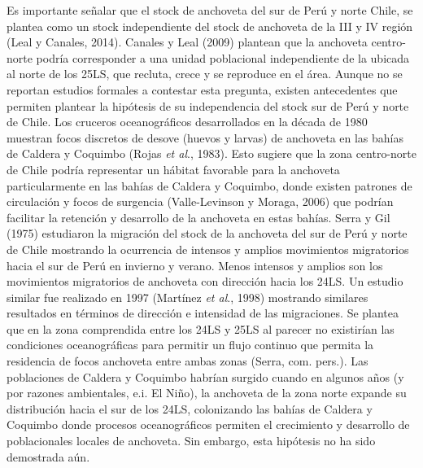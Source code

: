 \documentclass[letter,11pt]{article}
\begin{document}
Es importante se\~{n}alar que el stock de anchoveta del sur de Per\'u y norte
Chile, se plantea como un stock independiente del stock de anchoveta de
la III y IV regi\'on (Leal y Canales, 2014). Canales y Leal (2009)
plantean que la anchoveta centro-norte podr\'ia corresponder a una unidad
poblacional independiente de la ubicada al norte de los 25\degree LS, que
recluta, crece y se reproduce en el \'area. Aunque no se reportan estudios
formales a contestar esta pregunta, existen antecedentes que permiten
plantear la hip\'otesis de su independencia del stock sur de Per\'u y norte
de Chile. Los cruceros oceanogr\'aficos desarrollados en la d\'ecada de 1980
muestran focos discretos de desove (huevos y larvas) de anchoveta en las
bah\'ias de Caldera y Coquimbo (Rojas \textit{et al}., 1983). Esto sugiere
que la zona centro-norte de Chile podr\'ia representar un h\'abitat
favorable para la anchoveta particularmente en las bah\'ias de Caldera y
Coquimbo, donde existen patrones de circulaci\'on y focos de surgencia
(Valle-Levinson y Moraga, 2006) que podr\'ian facilitar la retenci\'on y
desarrollo de la anchoveta en estas bah\'ias. Serra y Gil (1975)
estudiaron la migraci\'on del stock de la anchoveta del sur de Per\'u y
norte de Chile mostrando la ocurrencia de intensos y amplios movimientos
migratorios hacia el sur de Per\'u en invierno y verano. Menos intensos y
amplios son los movimientos migratorios de anchoveta con direcci\'on hacia
los 24\degree LS. Un estudio similar fue realizado en 1997 (Mart\'inez
\textit{et al}., 1998) mostrando similares resultados en t\'erminos de
direcci\'on e intensidad de las migraciones. Se plantea que en la zona
comprendida entre los 24\degree LS y 25\degree LS al parecer no
existir\'ian las condiciones oceanogr\'aficas para permitir un flujo
continuo que permita la residencia de focos anchoveta entre ambas zonas
(Serra, com. pers.). Las poblaciones de Caldera y Coquimbo habr\'ian
surgido cuando en algunos a\~{n}os (y por razones ambientales, e.i. El
Ni\~{n}o), la anchoveta de la zona norte expande su distribuci\'on hacia el
sur de los 24\degree LS, colonizando las bah\'ias de Caldera y Coquimbo
donde procesos oceanogr\'aficos permiten el crecimiento y desarrollo de
poblacionales locales de anchoveta. Sin embargo, esta hip\'otesis no ha
sido demostrada a\'un. \vspace{0.5cm}
\end{document}
